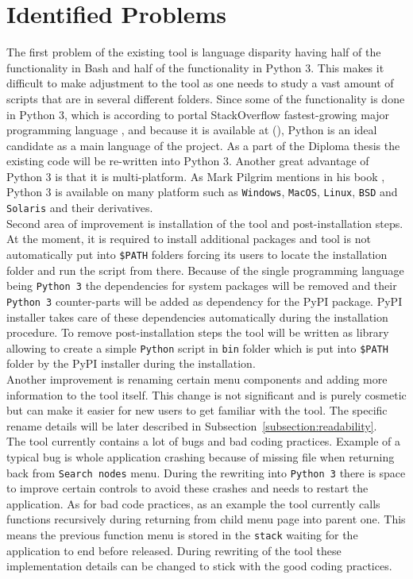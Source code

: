 \section{Identified Problems}
\label{section:improvement}
The first problem of the existing tool is language disparity having half of the functionality in Bash and half of the functionality in Python 3. This makes it difficult to make adjustment to the tool as one needs to study a vast amount of scripts that are in several different folders. Since some of the functionality is done in Python 3, which is according to portal StackOverflow fastest-growing major programming language \cite{pythonfastestgrowing}, and because it is available at  (), Python is an ideal candidate as a main language of the project. As a part of the Diploma thesis the existing code will be re-written into Python 3. Another great advantage of Python 3 is that it is multi-platform. As Mark Pilgrim mentions in his book \cite{Pilgrimc2010}, Python 3 is available on many platform such as \texttt{Windows}, \texttt{MacOS}, \texttt{Linux}, \texttt{BSD} and \texttt{Solaris} and their derivatives.\\
Second area of improvement is installation of the tool and post-installation steps. At the moment, it is required to install additional packages and tool is not automatically put into \texttt{\$PATH} folders forcing its users to locate the installation folder and run the script from there. Because of the single programming language being \texttt{Python 3} the dependencies for system packages will be removed and their \mbox{\texttt{Python 3}} counter-parts will be added as dependency for the PyPI package. PyPI installer takes care of these dependencies automatically during the installation procedure. To remove post-installation steps the tool will be written as library allowing to create a simple \texttt{Python} script in \texttt{bin} folder which is put into \texttt{\$PATH} folder by the PyPI installer during the installation.\\
Another improvement is renaming certain menu components and adding more information to the tool itself. This change is not significant and is purely cosmetic but can make it easier for new users to get familiar with the tool. The specific rename details will be later described in Subsection~\ref{subsection:readability}.\\
The tool currently contains a lot of bugs and bad coding practices. Example of a typical bug is whole application crashing because of missing file when returning back from \texttt{Search nodes} menu. During the rewriting into \texttt{Python 3} there is space to improve certain controls to avoid these crashes and needs to restart the application. As for bad code practices, as an example the tool currently calls functions recursively during returning from child menu page into parent one. This means the previous function menu is stored in the \texttt{stack} waiting for the application to end before released. During rewriting of the tool these implementation details can be changed to stick with the good coding practices. 
